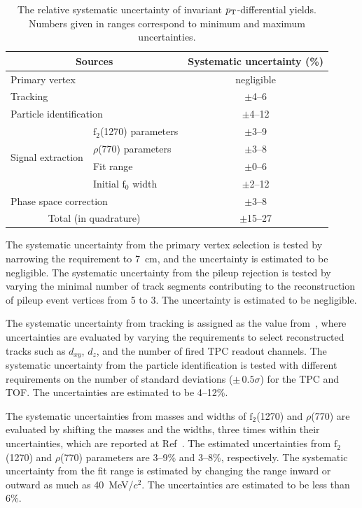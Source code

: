 \begin{table}[h!]
\caption{The relative systematic uncertainty of invariant $p_{\rm{T}}$-differential yields. Numbers given in ranges correspond to minimum and maximum uncertainties.}
\centering
\begin{tabular}{ll|c}
\hline 
\multicolumn{2}{c|}{Sources}  &Systematic uncertainty (\%) \\ \hline
\multicolumn{2}{l|}{Primary vertex} & negligible \\ 
\multicolumn{2}{l|}{Tracking} & $\pm$4--6 \\
\multicolumn{2}{l|}{Particle identification} & $\pm$4--12 \\ 
\multirow{4}{*}{Signal extraction} &  $\mathrm{f}_{2}$(1270) parameters	& $\pm$3--9 \\ 
& $\rho$(770) parameters & $\pm$3--8 \\
& Fit range & $\pm$0--6 \\
& Initial $\mathrm{f}_{0}$ width & $\pm$2--12 \\
\multicolumn{2}{l|}{Phase space correction} & $\pm$3--8 \\ \hline 
\multicolumn{2}{c|}{Total (in quadrature)}	& $\pm$15--27 \\ 
\hline 
\end{tabular}
\label{tab:syst}
\end{table}

The systematic uncertainty from the primary vertex selection is tested by narrowing the requirement to 7~cm, and the uncertainty is estimated to be negligible. The systematic uncertainty from the pileup rejection is tested by varying the minimal number of track segments contributing to the reconstruction of pileup event vertices from 5 to 3. The uncertainty is estimated to be negligible.

The systematic uncertainty from tracking is assigned as the value from~\cite{ALICE:2013wgn}, where uncertainties are evaluated by varying the requirements to select reconstructed tracks such as $d_{xy}$, $d_{z}$, and the number of fired TPC readout channels. The systematic uncertainty from the particle identification is tested with different requirements on the number of standard deviations ($\pm\,0.5\sigma$) for the TPC and TOF. The uncertainties are estimated to be 4--12\%.

The systematic uncertainties from masses and widths of $\mathrm{f}_{2}$(1270) and $\rho$(770) are evaluated by shifting the masses and the widths, three times within their uncertainties, which are reported at Ref~\cite{ParticleDataGroup:2020ssz}. The estimated uncertainties from $\mathrm{f}_{2}$(1270) and $\rho$(770) parameters are 3--9\% and 3--8\%, respectively. The systematic uncertainty from the fit range is estimated by changing the range inward or outward as much as 40~MeV/$c^{2}$. The uncertainties are estimated to be 
less than 6\%.


